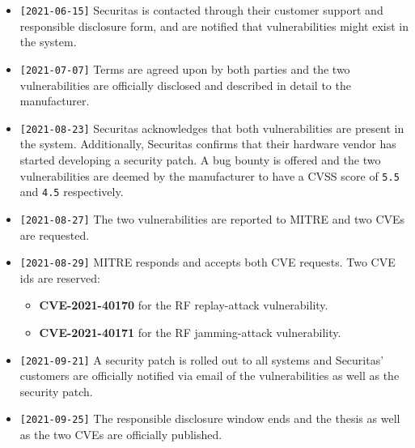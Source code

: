 \begin{itemize}
    \item \verb![2021-06-15]! Securitas is contacted through their customer support and responsible disclosure form, and are notified that vulnerabilities might exist in the system.
    \item \verb![2021-07-07]! Terms are agreed upon by both parties and the two vulnerabilities are officially disclosed and described in detail to the manufacturer.
    \newpage
    \item \verb![2021-08-23]! Securitas acknowledges that both vulnerabilities are present in the system. Additionally, Securitas confirms that their hardware vendor has started developing a security patch. A bug bounty is offered and the two vulnerabilities are deemed by the manufacturer to have a CVSS score of \texttt{5.5} and \texttt{4.5} respectively.
    \item \verb![2021-08-27]! The two vulnerabilities are reported to MITRE and two CVEs are requested.
    \item \verb![2021-08-29]! MITRE responds and accepts both CVE requests. Two CVE ids are reserved:
        \begin{itemize}
            \item \textbf{CVE-2021-40170} for the RF replay-attack vulnerability.
            \item \textbf{CVE-2021-40171} for the RF jamming-attack vulnerability.
        \end{itemize}
    \item \verb![2021-09-21]! A security patch is rolled out to all systems and Securitas' customers are officially notified via email of the vulnerabilities as well as the security patch.
    \item \verb![2021-09-25]! The responsible disclosure window ends and the thesis as well as the two CVEs are officially published.
\end{itemize}